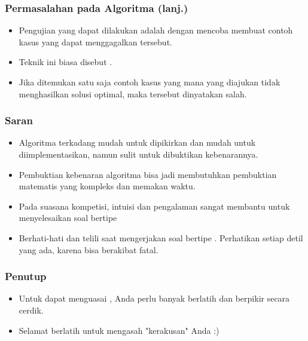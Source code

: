 \begin{frame}
  \frametitle{Permasalahan pada Algoritma \fGreedy (lanj.)}
  \begin{itemize}
    \item Pengujian yang dapat dilakukan adalah dengan mencoba membuat contoh kasus yang dapat menggagalkan \fGreedyChoice tersebut.
    \item Teknik ini biasa disebut .
    \item Jika ditemukan satu saja contoh kasus yang mana \fGreedyChoice yang diajukan tidak menghasilkan solusi optimal, maka \fGreedyChoice tersebut dinyatakan salah.
  \end{itemize}
\end{frame}

\begin{frame}
\frametitle{Saran}
  \begin{itemize}
    \item Algoritma \fGreedy terkadang mudah untuk dipikirkan dan mudah untuk diimplementasikan, namun sulit untuk dibuktikan kebenarannya.
    \item Pembuktian kebenaran algoritma \fGreedy bisa jadi membutuhkan pembuktian matematis yang kompleks dan memakan waktu.
    \item Pada suasana kompetisi, intuisi dan pengalaman sangat membantu untuk menyelesaikan soal bertipe \fGreedy
    \item Berhati-hati dan telili saat mengerjakan soal bertipe \fGreedy. Perhatikan setiap detil yang ada, karena  bisa berakibat fatal.
  \end{itemize}
\end{frame}

\begin{frame}
\frametitle{Penutup}
  \begin{itemize}
    \item Untuk dapat menguasai \fGreedy, Anda perlu banyak berlatih dan berpikir secara cerdik.
    \item Selamat berlatih untuk mengasah "kerakusan" Anda :)
  \end{itemize}
\end{frame}


